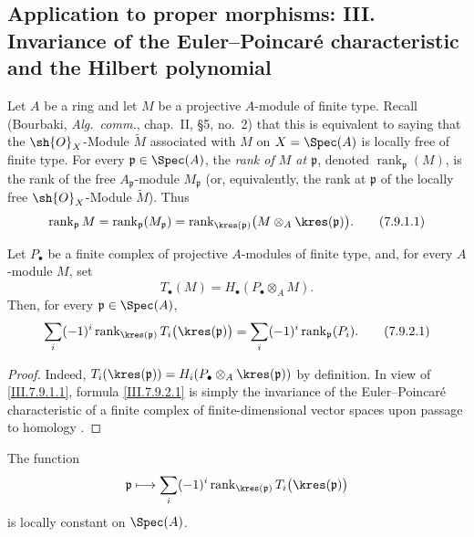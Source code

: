 \subsection{Application to proper morphisms: III. Invariance of the
Euler--Poincar\'e characteristic and the Hilbert polynomial}
\label{subsection:III.7.9}
\label{III.7.9}

\begin{env}[7.9.1]
\label{III.7.9.1}
Let $A$ be a ring and let $M$ be a projective $A$-module of
finite type.  Recall (Bourbaki, \emph{Alg.~comm.}, chap.~II,
\S5, no.~2) that this is equivalent to saying that the
$\sh{O}_X$-Module $\widetilde M$ associated with $M$ on
$X=\Spec(A)$ is locally free of finite type.  For every
$\mathfrak p\in\Spec(A)$, the \emph{rank of $M$ at
$\mathfrak p$}, denoted $\operatorname{rank}_{\mathfrak p}(M)$,
is the rank of the free $A_{\mathfrak p}$-module
$M_{\mathfrak p}$ (or, equivalently, the rank at
$\mathfrak p$ of the locally free $\sh{O}_X$-Module
$\widetilde M$).  Thus
\[
  \operatorname{rank}_{\mathfrak p}M
  =
  \operatorname{rank}_{\mathfrak p}(M_{\mathfrak p})
  =
  \operatorname{rank}_{\kres(\mathfrak p)}
    \bigl(M\otimes_A\kres(\mathfrak p)\bigr).
  \tag{7.9.1.1}\label{III.7.9.1.1}
\]
\end{env}

\begin{proposition}[7.9.2]
\label{III.7.9.2}
Let $P_\bullet$ be a finite complex of projective $A$-modules
of finite type, and, for every $A$-module $M$, set
\[
  T_\bullet(M)=H_\bullet(P_\bullet\otimes_A M).
\]
Then, for every $\mathfrak p\in\Spec(A)$,
\[
  \sum_i(-1)^i
    \operatorname{rank}_{\kres(\mathfrak p)}
      T_i\bigl(\kres(\mathfrak p)\bigr)
  =
  \sum_i(-1)^i\operatorname{rank}_{\mathfrak p}(P_i).
  \tag{7.9.2.1}\label{III.7.9.2.1}
\]
\end{proposition}

\begin{proof}
Indeed,
$T_i(\kres(\mathfrak p))
 =H_i(P_\bullet\otimes_A\kres(\mathfrak p))$ by definition.
In view of \eqref{III.7.9.1.1}, formula
\eqref{III.7.9.2.1} is simply the invariance of the
Euler--Poincar\'e characteristic of a finite complex of
finite-dimensional vector spaces upon passage to homology
.
\end{proof}

\begin{corollary}[7.9.3]
\label{III.7.9.3}
The function
\[
  \mathfrak p\longmapsto
  \sum_i(-1)^i
    \operatorname{rank}_{\kres(\mathfrak p)}
      T_i\bigl(\kres(\mathfrak p)\bigr)
\]
is locally constant on $\Spec(A)$.
\end{corollary}

